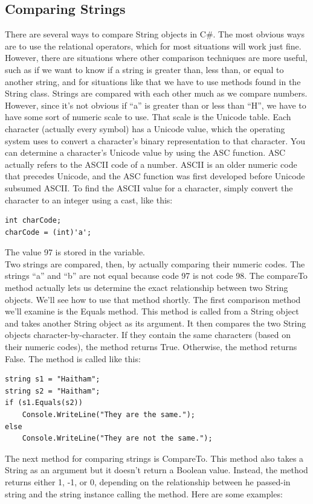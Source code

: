 \documentclass[12pt,a4paper,final,twoside,titlepage]{book}
\begin{document}
\subsection{Comparing Strings}
There are several ways to compare String objects in C\#. The most obvious ways are to use the relational operators, which for most situations will work just fine. However, there are situations where other comparison techniques are more useful, such as if we want to know if a string is greater than, less than, or equal to another string, and for situations like that we have to use methods found in the String class. Strings are compared with each other much as we compare numbers. However, since it’s not obvious if “a” is greater than or less than “H”, we have to have some sort of numeric scale to use. That scale is the Unicode table. Each character (actually every symbol) has a Unicode value, which the operating system uses to convert a character’s binary representation to that character. You can determine a character’s Unicode value by using the ASC function. ASC actually refers to the ASCII code of a number. ASCII is an older numeric code that precedes Unicode, and the ASC function was first developed before Unicode subsumed ASCII.
To find the ASCII value for a character, simply convert the character to an integer using a cast, like this:
\begin{lstlisting}
int charCode;
charCode = (int)'a';
\end{lstlisting}
The value 97 is stored in the variable.\\
Two strings are compared, then, by actually comparing their numeric codes. The strings “a” and “b” are not equal because code 97 is not code 98. The compareTo method actually lets us determine the exact relationship between two String objects. We’ll see how to use that method shortly. The first comparison method we’ll examine is the Equals method. This method is called from a String object and takes another String object as its argument. It then compares the two String objects character-by-character. If they contain the same characters (based on their numeric codes), the method returns True. Otherwise, the method returns False. The method is called like this:
\begin{lstlisting}
string s1 = "Haitham";
string s2 = "Haitham";
if (s1.Equals(s2))
	Console.WriteLine("They are the same.");
else
	Console.WriteLine("They are not the same.");
\end{lstlisting}
The next method for comparing strings is CompareTo. This method also takes a String as an argument but it doesn’t return a Boolean value. Instead, the method returns either 1, -1, or 0, depending on the relationship between he passed-in string and the string instance calling the method. Here are some examples:
\end{document}
